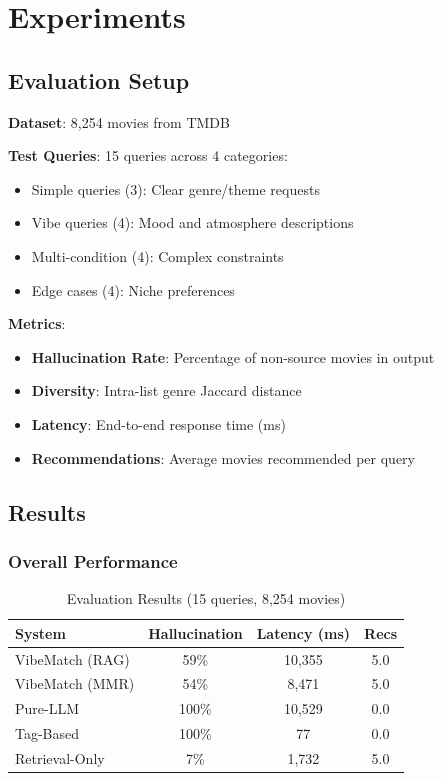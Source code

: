 \documentclass[11pt,a4paper]{article}
\begin{document}
\section{Experiments}

\subsection{Evaluation Setup}

\textbf{Dataset}: 8,254 movies from TMDB

\textbf{Test Queries}: 15 queries across 4 categories:
\begin{itemize}
    \item Simple queries (3): Clear genre/theme requests
    \item Vibe queries (4): Mood and atmosphere descriptions
    \item Multi-condition (4): Complex constraints
    \item Edge cases (4): Niche preferences
\end{itemize}

\textbf{Metrics}:
\begin{itemize}
    \item \textbf{Hallucination Rate}: Percentage of non-source movies in output
    \item \textbf{Diversity}: Intra-list genre Jaccard distance
    \item \textbf{Latency}: End-to-end response time (ms)
    \item \textbf{Recommendations}: Average movies recommended per query
\end{itemize}

\subsection{Results}

\subsubsection{Overall Performance}

\begin{table}[h]
\centering
\begin{tabular}{lccc}
\toprule
\textbf{System} & \textbf{Hallucination} & \textbf{Latency (ms)} & \textbf{Recs} \\
\midrule
VibeMatch (RAG) & 59\% & 10,355 & 5.0 \\
VibeMatch (MMR) & 54\% & 8,471 & 5.0 \\
Pure-LLM & 100\% & 10,529 & 0.0 \\
Tag-Based & 100\% & 77 & 0.0 \\
Retrieval-Only & 7\% & 1,732 & 5.0 \\
\bottomrule
\end{tabular}
\caption{Evaluation Results (15 queries, 8,254 movies)}
\end{table}
\end{document}
